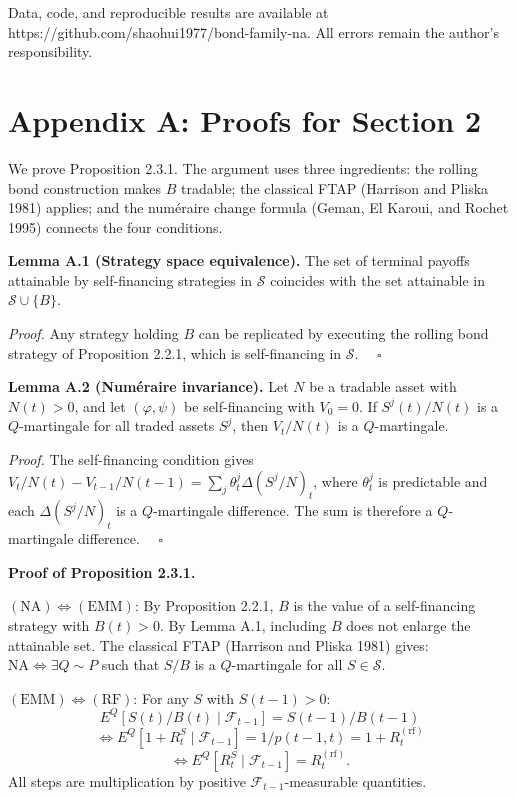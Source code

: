 \documentclass[
]{article}
\begin{document}
Data, code, and reproducible results are available at
https://github.com/shaohui1977/bond-family-na. All errors remain the
author's responsibility.

\section{Appendix A: Proofs for Section
2}\label{appendix-a-proofs-for-section-2}

We prove Proposition 2.3.1. The argument uses three ingredients: the
rolling bond construction makes \(B\) tradable; the classical FTAP
(Harrison and Pliska 1981) applies; and the numéraire change formula
(Geman, El Karoui, and Rochet 1995) connects the four conditions.

\textbf{Lemma A.1 (Strategy space equivalence).} The set of terminal
payoffs attainable by self-financing strategies in \(\mathcal{S}\)
coincides with the set attainable in \(\mathcal{S} \cup \{B\}\).

\emph{Proof.} Any strategy holding \(B\) can be replicated by executing
the rolling bond strategy of Proposition 2.2.1, which is self-financing
in \(\mathcal{S}\). \(\quad\square\)

\textbf{Lemma A.2 (Numéraire invariance).} Let \(N\) be a tradable asset
with \(N(t) > 0\), and let \((\varphi, \psi)\) be self-financing with
\(V_0 = 0\). If \(S^j(t)/N(t)\) is a \(Q\)-martingale for all traded
assets \(S^j\), then \(V_t/N(t)\) is a \(Q\)-martingale.

\emph{Proof.} The self-financing condition gives
\(V_t/N(t) - V_{t-1}/N(t-1) = \sum_j \theta^j_t \Delta(S^j/N)_t\), where
\(\theta^j_t\) is predictable and each \(\Delta(S^j/N)_t\) is a
\(Q\)-martingale difference. The sum is therefore a \(Q\)-martingale
difference. \(\quad\square\)

\textbf{Proof of Proposition 2.3.1.}

\((\text{NA}) \iff (\text{EMM})\): By Proposition 2.2.1, \(B\) is the
value of a self-financing strategy with \(B(t) > 0\). By Lemma A.1,
including \(B\) does not enlarge the attainable set. The classical FTAP
(Harrison and Pliska 1981) gives: \(\text{NA} \iff \exists Q \sim P\)
such that \(S/B\) is a \(Q\)-martingale for all \(S \in \mathcal{S}\).

\((\text{EMM}) \iff (\text{RF})\): For any \(S\) with \(S(t-1) > 0\):
\[E^Q[S(t)/B(t) \mid \mathcal{F}_{t-1}] = S(t-1)/B(t-1)\]
\[\iff E^Q[1 + R_t^S \mid \mathcal{F}_{t-1}] = 1/p(t-1,t)
  = 1 + R_t^{(\text{rf})}\]
\[\iff E^Q[R_t^S \mid \mathcal{F}_{t-1}] = R_t^{(\text{rf})}.\] All
steps are multiplication by positive \(\mathcal{F}_{t-1}\)-measurable
quantities.
\end{document}
